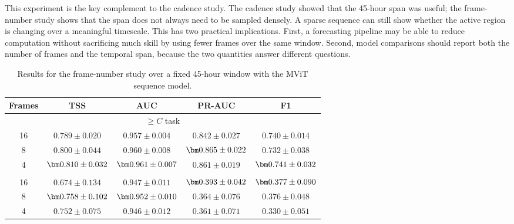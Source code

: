 This experiment is the key complement to the cadence study. The cadence study showed that the 45-hour span was useful; the frame-number study shows that the span does not always need to be sampled densely. A sparse sequence can still show whether the active region is changing over a meaningful timescale. This has two practical implications. First, a forecasting pipeline may be able to reduce computation without sacrificing much skill by using fewer frames over the same window. Second, model comparisons should report both the number of frames and the temporal span, because the two quantities answer different questions.

\begin{table}[H]
\caption{Results for the frame-number study over a fixed 45-hour window with the MViT sequence model.}
\centering
\label{tab:frames}
\small
\renewcommand{\arraystretch}{1.15}
\setlength{\tabcolsep}{8pt}
\begin{tabular}{@{}ccccc@{}}
\toprule
Frames & TSS & AUC & PR-AUC & F1 \\
\midrule
\multicolumn{5}{c}{$\geq C$ task} \\
\midrule
16 & $0.789 \pm 0.020$ & $0.957 \pm 0.004$ & $0.842 \pm 0.027$ & $0.740 \pm 0.014$ \\
8  & $0.800 \pm 0.044$ & $0.960 \pm 0.008$ & $\best{0.865 \pm 0.022}$ & $0.732 \pm 0.038$ \\
4  & $\best{0.810 \pm 0.032}$ & $\best{0.961 \pm 0.007}$ & $0.861 \pm 0.019$ & $\best{0.741 \pm 0.032}$ \\
\addlinespace
\multicolumn{5}{c}{$\geq M$ task} \\
\midrule
16 & $0.674 \pm 0.134$ & $0.947 \pm 0.011$ & $\best{0.393 \pm 0.042}$ & $\best{0.377 \pm 0.090}$ \\
8  & $\best{0.758 \pm 0.102}$ & $\best{0.952 \pm 0.010}$ & $0.364 \pm 0.076$ & $0.376 \pm 0.048$ \\
4  & $0.752 \pm 0.075$ & $0.946 \pm 0.012$ & $0.361 \pm 0.071$ & $0.330 \pm 0.051$ \\
\bottomrule
\end{tabular}
\end{table}


